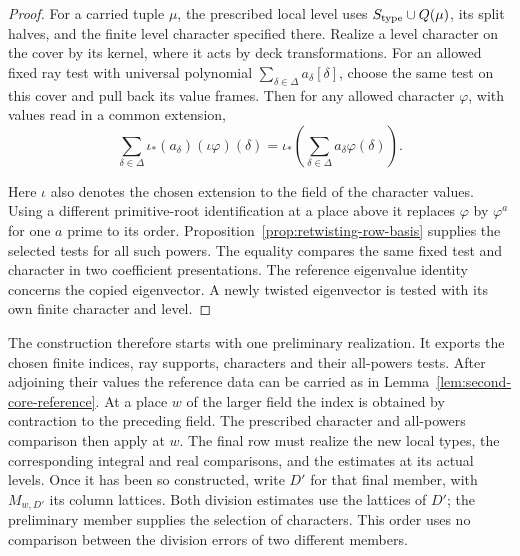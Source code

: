 \begin{proof}
For a carried tuple \(\mu\), the prescribed local level uses
\(S_{\rm type}\cup Q(\mu)\), its split halves, and the finite
level character specified there. Realize a level character on
the cover by its kernel, where it acts by deck transformations.
For an allowed fixed ray test with universal polynomial
\(\sum_{\delta\in\Delta} a_\delta[\delta]\), choose the same
test on this cover and pull back its value frames. Then for any
allowed character \(\varphi\), with values read in a common
extension,
\[
       \sum_{\delta\in\Delta}\iota_*(a_\delta)
                   (\iota\varphi)(\delta)
        =\iota_*\!\left(\sum_{\delta\in\Delta}
                         a_\delta\varphi(\delta)\right).
\]

Here \(\iota\) also denotes the chosen extension to the field
of the character values. Using a different primitive-root
identification at a place above it replaces \(\varphi\) by
\(\varphi^a\) for one \(a\) prime to its order.
Proposition~\ref{prop:retwisting-row-basis} supplies the
selected tests for all such powers. The equality compares the
same fixed test and character in two coefficient presentations.
The reference eigenvalue identity concerns the copied
eigenvector. A newly twisted eigenvector is tested with its
own finite character and level.
\end{proof}

The construction therefore starts with one preliminary realization.
It exports the chosen finite indices, ray supports, characters and
their all-powers tests. After adjoining their values the reference
data can be carried as in Lemma~\ref{lem:second-core-reference}.
At a place \(w\) of the larger field the index is obtained by
contraction to the preceding field. The prescribed character
and all-powers comparison then apply at \(w\). The final row
must realize the new local types, the corresponding integral
and real comparisons, and the estimates at its actual levels.
Once it has been so constructed, write \(D'\) for that final
member, with \(M_{w,D'}\) its column lattices.
Both division estimates use the lattices of \(D'\); the
preliminary member supplies the selection of characters. This
order uses no comparison between the division errors of two
different members.

